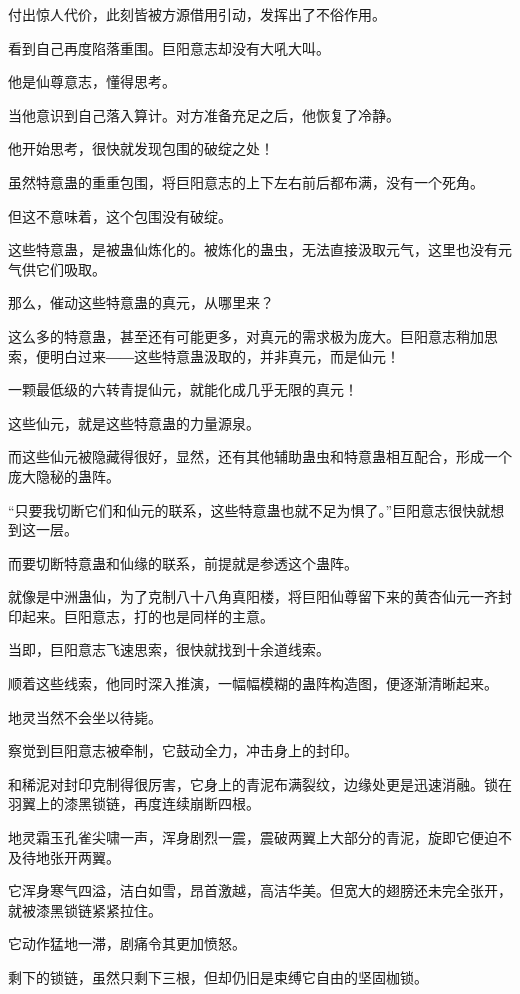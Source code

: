 \begin{this_body}
付出惊人代价，此刻皆被方源借用引动，发挥出了不俗作用。

看到自己再度陷落重围。巨阳意志却没有大吼大叫。

他是仙尊意志，懂得思考。

当他意识到自己落入算计。对方准备充足之后，他恢复了冷静。

他开始思考，很快就发现包围的破绽之处！

虽然特意蛊的重重包围，将巨阳意志的上下左右前后都布满，没有一个死角。

但这不意味着，这个包围没有破绽。

这些特意蛊，是被蛊仙炼化的。被炼化的蛊虫，无法直接汲取元气，这里也没有元气供它们吸取。

那么，催动这些特意蛊的真元，从哪里来？

这么多的特意蛊，甚至还有可能更多，对真元的需求极为庞大。巨阳意志稍加思索，便明白过来――这些特意蛊汲取的，并非真元，而是仙元！

一颗最低级的六转青提仙元，就能化成几乎无限的真元！

这些仙元，就是这些特意蛊的力量源泉。

而这些仙元被隐藏得很好，显然，还有其他辅助蛊虫和特意蛊相互配合，形成一个庞大隐秘的蛊阵。

“只要我切断它们和仙元的联系，这些特意蛊也就不足为惧了。”巨阳意志很快就想到这一层。

而要切断特意蛊和仙缘的联系，前提就是参透这个蛊阵。

就像是中洲蛊仙，为了克制八十八角真阳楼，将巨阳仙尊留下来的黄杏仙元一齐封印起来。巨阳意志，打的也是同样的主意。

当即，巨阳意志飞速思索，很快就找到十余道线索。

顺着这些线索，他同时深入推演，一幅幅模糊的蛊阵构造图，便逐渐清晰起来。

地灵当然不会坐以待毙。

察觉到巨阳意志被牵制，它鼓动全力，冲击身上的封印。

和稀泥对封印克制得很厉害，它身上的青泥布满裂纹，边缘处更是迅速消融。锁在羽翼上的漆黑锁链，再度连续崩断四根。

地灵霜玉孔雀尖啸一声，浑身剧烈一震，震破两翼上大部分的青泥，旋即它便迫不及待地张开两翼。

它浑身寒气四溢，洁白如雪，昂首激越，高洁华美。但宽大的翅膀还未完全张开，就被漆黑锁链紧紧拉住。

它动作猛地一滞，剧痛令其更加愤怒。

剩下的锁链，虽然只剩下三根，但却仍旧是束缚它自由的坚固枷锁。


\end{this_body}
